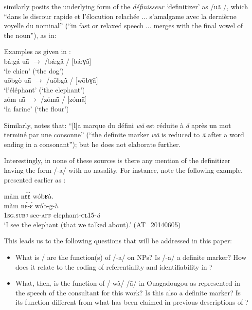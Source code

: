 \documentclass[output=paper]{langsci/langscibook}
\begin{document}
\cite[179]{canu1974} similarly posits the underlying form of the \textit{définisseur} ‘definitizer’ as /uã\={} /, which “dans le discour rapide et l’élocution relachée ... s’amalgame avec la dernièrne voyelle du nominal” (“in fast or relaxed speech ... merges with the final vowel of the noun”), as in:

\ea\label{ex:teo:12}
Examples as given in \citet[179]{canu1974}:\\
bá:gá u\={ã}  \textup{${\rightarrow}$}\textup{ /bá:g\'{ã} / [bá:ɣ\'{ã}]} \\
‘le chien’ (‘the dog’)\\

u\={o}bgò u\={ã}  \textup{${\rightarrow}$}\textup{ /u\={o}bg\`{ã} / [w\={o}bɣ\`{ã}]} \\
‘l’éléphant’ (‘the elephant’)\\

zóm u\={ã}  \textup{${\rightarrow}$}\textup{ /zóm\={ã} / [zóm\={ã}]} \\
‘la farine’ (‘the flour’)
\z

Similarly, \cite[96]{Nikiema1989} notes that: “[l]a marque du défini \textit{wã} est réduite à \textit{ã} après un mot terminé par une consonne” (“the definite marker \textit{wã} is reduced to \textit{ã} after a word ending in a consonant”); but he does not elaborate further.

Interestingly, in none of these sources is there any mention of the definitizer having the form /-a/ with no nasality. For instance, note the following example, presented earlier as :

\ea\label{ex:teo:4repeated}
\glll màm n\'ɛ\`ɛ wóbʁà.\\
 màm n\'ɛ-\`ɛ wób-g-à\\
\textsc{1sg.subj} see-\textsc{aff} elephant-\textsc{cl15-}\textit{à} \\
\glt ‘I see the elephant (that we talked about).’ (AT\_20140605)
\z

This leads us to the following questions that will be addressed in this paper:
 
\begin{itemize}[noitemsep]
	\item What is / are the function(s) of /-a/ on NPs? Is /-a/ a definite marker? How does it relate to the coding of referentiality and identifiability in ?
\item What, then, is the function of /-wã/ {\Tilde} /ã/ in Ouagadougou  as represented in the speech of the consultant for this work? Is this also a definite marker? Is its function different from what has been claimed in previous descriptions of ?
\end{itemize}
\end{document}
